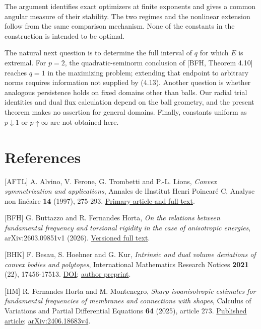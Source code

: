 \documentclass[11pt]{article}
\begin{document}
The argument identifies exact optimizers at finite exponents and gives a
common angular measure of their stability. The two regimes and the
nonlinear extension follow from the same comparison mechanism. None of
the constants in the construction is intended to be optimal.

The natural next question is to determine the full interval of \(q\) for
which \(E\) is extremal. For \(p=2\), the quadratic-seminorm conclusion
of {[}BFH, Theorem 4.10{]} reaches \(q=1\) in the maximizing problem;
extending that endpoint to arbitrary norms requires information not
supplied by (4.13). Another question is whether analogous persistence
holds on fixed domains other than balls. Our radial trial identities and
dual flux calculation depend on the ball geometry, and the present
theorem makes no assertion for general domains. Finally, constants
uniform as \(p\downarrow1\) or \(p\uparrow\infty\) are not obtained
here.

\sloppy\section{References}\label{references}

{[}AFTL{]} A. Alvino, V. Ferone, G. Trombetti and P.-L. Lions,
\emph{Convex symmetrization and applications}, Annales de
l\textquotesingle Institut Henri Poincaré C, Analyse non linéaire
\textbf{14} (1997), 275-293.
\href{https://www.numdam.org/item/AIHPC_1997__14_2_275_0/}{Primary
article and full text}.

{[}BFH{]} G. Buttazzo and R. Fernandes Horta, \emph{On the relations
between fundamental frequency and torsional rigidity in the case of
anisotropic energies}, arXiv:2603.09851v1 (2026).
\href{https://arxiv.org/html/2603.09851v1}{Versioned full text}.

{[}BHK{]} F. Besau, S. Hoehner and G. Kur, \emph{Intrinsic and dual
volume deviations of convex bodies and polytopes}, International
Mathematics Research Notices \textbf{2021} (22), 17456-17513.
\href{https://doi.org/10.1093/imrn/rnz277}{DOI};
\href{https://arxiv.org/abs/1905.08862}{author preprint}.

{[}HM{]} R. Fernandes Horta and M. Montenegro, \emph{Sharp
isoanisotropic estimates for fundamental frequencies of membranes and
connections with shapes}, Calculus of Variations and Partial
Differential Equations \textbf{64} (2025), article 273.
\href{https://doi.org/10.1007/s00526-025-03114-2}{Published article};
\href{https://arxiv.org/html/2406.18683v4}{arXiv:2406.18683v4}.
\end{document}
